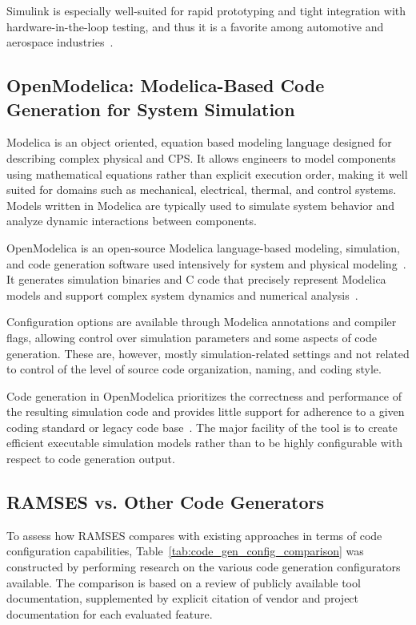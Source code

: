 Simulink is especially well-suited for rapid prototyping and tight integration with hardware-in-the-loop testing, and thus it is a favorite among automotive and aerospace industries~\cite{Simulink_automotive_applications}.


\subsection{OpenModelica: Modelica-Based Code Generation for System Simulation}
\label{sec:openModelIntro}

Modelica is an object oriented, equation based modeling language designed for describing complex physical and \gls{CPS}. It allows engineers to model components using mathematical equations rather than explicit execution order, making it well suited for domains such as mechanical, electrical, thermal, and control systems. Models written in Modelica are typically used to simulate system behavior and analyze dynamic interactions between components.

OpenModelica is an open-source Modelica language-based modeling, simulation, and code generation software used intensively for system and physical modeling~\cite{openmodelica-home}. It generates simulation binaries and C code that precisely represent Modelica models and support complex system dynamics and numerical analysis~\cite{openmodelica-codegen}.

Configuration options are available through Modelica annotations and compiler flags, allowing control over simulation parameters and some aspects of code generation. These are, however, mostly simulation-related settings and not related to control of the level of source code organization, naming, and coding style.

Code generation in OpenModelica prioritizes the correctness and performance of the resulting simulation code and provides little support for adherence to a given coding standard or legacy code base~\cite{openmodelica-performance}. The major facility of the tool is to create efficient executable simulation models rather than to be highly configurable with respect to code generation output.


\subsection{RAMSES vs. Other Code Generators}
\label{sec:ramses_vs_others}

To assess how \gls{RAMSES} compares with existing approaches in terms of code configuration capabilities, Table~\ref{tab:code_gen_config_comparison} was constructed by performing research on the various code generation configurators available. The comparison is based on a review of publicly available tool documentation, supplemented by explicit citation of vendor and project documentation for each evaluated feature.

